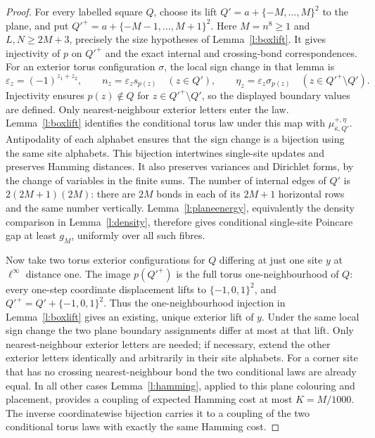 \begin{proof}
For every labelled square \(Q\), choose its lift
\(Q'=a+\{-M,\ldots,M\}^2\) to the plane, and put
\(Q'^+=a+\{-M-1,\ldots,M+1\}^2\).
Here \(M=n^8\ge1\) and \(L,N\ge2M+3\), precisely the size
hypotheses of Lemma~\ref{l:boxlift}.  It gives injectivity of
\(p\) on \(Q'^+\) and the exact internal and crossing-bond
correspondences.  For an exterior torus configuration \(\sigma\),
the local sign change in that lemma is
\[
 \varepsilon_z=(-1)^{z_1+z_2},\qquad
 n_z=\varepsilon_zs_{p(z)}\quad(z\in Q'),\qquad
 \eta_z=\varepsilon_z\sigma_{p(z)}
                                  \quad(z\in Q'^+\setminus Q').
\]
Injectivity ensures \(p(z)\notin Q\) for
\(z\in Q'^+\setminus Q'\), so the displayed boundary values
are defined.  Only nearest-neighbour exterior letters enter the law.
Lemma~\ref{l:boxlift} identifies the conditional torus law under
this map with \(\mu^{+,\eta}_{\bar\kappa,Q'}\).
Antipodality of each alphabet
ensures that the sign change is a bijection using the same site
alphabets.  This bijection intertwines single-site updates and
preserves Hamming distances.  It also preserves variances and
Dirichlet forms, by the change of variables in the finite sums.
The number of internal edges of \(Q'\) is
\(2(2M+1)(2M)\): there are \(2M\) bonds in each of its
\(2M+1\) horizontal rows and the same number vertically.
Lemma~\ref{l:planeenergy}, equivalently the density comparison in
Lemma~\ref{l:density}, therefore gives conditional single-site
Poincare gap at least \(g_M\), uniformly over all such fibres.

Now take two torus exterior configurations for \(Q\) differing at
just one site \(y\) at \(\ell^\infty\) distance one.
The image \(p(Q'^+)\) is the full torus one-neighbourhood of \(Q\):
every one-step coordinate displacement lifts to
\(\{-1,0,1\}^2\), and
\(Q'^+=Q'+\{-1,0,1\}^2\).
Thus the one-neighbourhood injection in Lemma~\ref{l:boxlift}
gives an existing, unique exterior lift of \(y\).
Under the same local
sign change the two plane boundary assignments differ at most at
that lift.  Only nearest-neighbour exterior letters are needed; if
necessary, extend the other exterior letters identically and
arbitrarily in their site alphabets.  For a corner site that has no
crossing nearest-neighbour bond the two conditional laws are already
equal.  In all other cases Lemma~\ref{l:hamming}, applied to this
plane colouring and placement, provides a coupling of expected
Hamming cost at most \(K=M/1000\).  The inverse coordinatewise
bijection carries it to a coupling of the two conditional torus laws
with exactly the same Hamming cost.


\end{proof}
